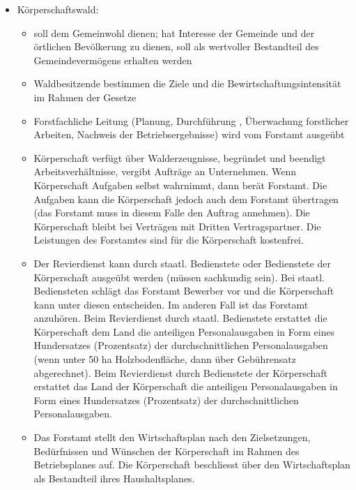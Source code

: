 \documentclass{article}
\begin{document}
\begin{itemize}
\begin{itemize}
      \end{itemize}


   \item Körperschaftswald: 

	 \begin{itemize} 
		
		\item soll dem Gemeinwohl dienen; hat Interesse der Gemeinde und der örtlichen Bevölkerung zu dienen, soll als wertvoller Bestandteil des Gemeindevermögens erhalten werden
		
		\item Waldbesitzende bestimmen die Ziele und die Bewirtschaftungsintensität im Rahmen der Gesetze
		
		\item Forstfachliche Leitung (Planung, Durchführung , Überwachung forstlicher Arbeiten, Nachweis der Betriebsergebnisse) wird vom Forstamt ausgeübt
		
		\item Körperschaft verfügt über Walderzeugnisse, begründet und beendigt Arbeitsverhältnisse, vergibt Aufträge an Unternehmen. Wenn Körperschaft Aufgaben selbst wahrnimmt, dann berät Forstamt. Die Aufgaben kann die Körperschaft jedoch auch dem Forstamt übertragen (das Forstamt muss in diesem Falle den Auftrag annehmen). Die Körperschaft bleibt bei Verträgen mit Dritten Vertragspartner. Die Leistungen des Forstamtes sind für die Körperschaft kostenfrei.
		
		\item Der Revierdienst kann durch staatl. Bedienstete oder Bedienstete der Körperschaft ausgeübt werden (müssen sachkundig sein). Bei staatl. Bediensteten schlägt das Forstamt Bewerber vor und die Körperschaft kann unter diesen entscheiden. Im anderen Fall ist das Forstamt anzuhören. Beim Revierdienst durch staatl. Bedienstete erstattet die Körperschaft dem Land die anteiligen Personalausgaben in Form eines Hundersatzes (Prozentsatz) der durchschnittlichen Personalausgaben (wenn unter 50 ha Holzbodenfläche, dann über Gebührensatz abgerechnet). Beim Revierdienst durch Bedienstete der Körperschaft erstattet das Land der Körperschaft die anteiligen Personalausgaben in Form eines Hundersatzes (Prozentsatz) der durchschnittlichen Personalausgaben.
		
		\item Das Forstamt stellt den Wirtschaftsplan nach den Zielsetzungen, Bedürfnissen und Wünschen der Körperschaft im Rahmen des Betriebsplanes auf. Die Körperschaft beschliesst über den Wirtschaftsplan als Bestandteil ihres Haushaltsplanes.
		

\end{itemize}
\end{itemize}
\end{document}
